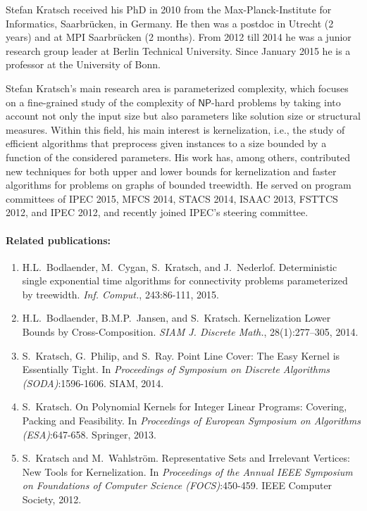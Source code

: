 \documentclass[a4paper,10pt]{article}
\newcommand{\NP}{\ensuremath{\mathsf{NP}}\xspace}
\begin{document}
Stefan Kratsch received his PhD in 2010 from the Max-Planck-Institute for Informatics, Saarbr\"ucken, in Germany. He then was a postdoc in Utrecht (2 years) and at MPI Saarbr\"ucken (2 months). From 2012 till 2014 he was a junior research group leader at Berlin Technical University. Since January 2015 he is a professor at the University of Bonn.

Stefan Kratsch's main research area is parameterized complexity, which focuses on a fine-grained study of the complexity of \NP-hard problems by taking into account not only the input size but also parameters like solution size or structural measures. Within this field, his main interest is kernelization, i.e., the study of efficient algorithms that preprocess given instances to a size bounded by a function of the considered parameters. His work has, among others, contributed new techniques for both upper and lower bounds for kernelization and faster algorithms for problems on graphs of bounded treewidth. He served on program committees of IPEC 2015, MFCS 2014, STACS 2014, ISAAC 2013, FSTTCS 2012, and IPEC 2012, and recently joined IPEC's steering committee.

\paragraph{Related publications:}
\begin{enumerate}
\item H.L.~Bodlaender, M.~Cygan, S.~Kratsch, and J.~Nederlof. \newblock Deterministic single exponential time algorithms for connectivity problems parameterized by treewidth. \newblock \emph{Inf. Comput.}, 243:86-111, 2015.
\item H.L.~Bodlaender, B.M.P.~Jansen, and S.~Kratsch. \newblock Kernelization Lower Bounds by Cross-Composition. \newblock \emph{{SIAM} J. Discrete Math.}, 28(1):277--305, 2014.
\item S.~Kratsch, G.~Philip, and S.~Ray. \newblock Point Line Cover: The Easy Kernel is Essentially Tight. \newblock In \emph{Proceedings of Symposium on Discrete Algorithms (SODA)}:1596-1606. SIAM, 2014.
\item S.~Kratsch. \newblock On Polynomial Kernels for Integer Linear Programs: Covering, Packing and Feasibility. \newblock In \emph{Proceedings of European Symposium on Algorithms (ESA)}:647-658. Springer, 2013.
\item S.~Kratsch and M.~Wahlstr\"om. \newblock Representative Sets and Irrelevant Vertices: New Tools for Kernelization. \newblock In \emph{Proceedings of the Annual IEEE Symposium on Foundations of
  Computer Science (FOCS)}:450-459. IEEE Computer Society, 2012.
\end{enumerate}
\end{document}
